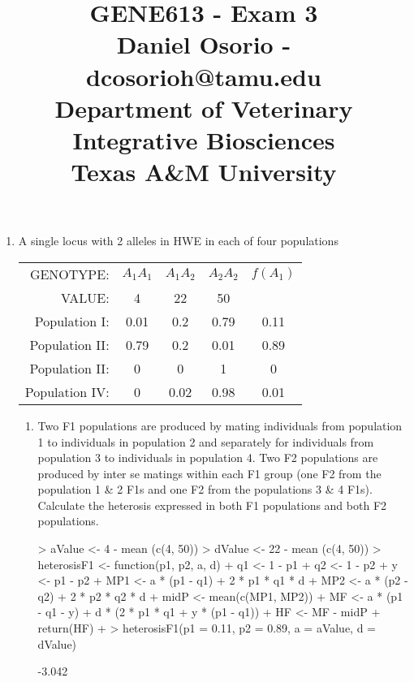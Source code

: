 \documentclass[12pt,a4paper]{paper}
\begin{document}
\title{GENE613 - Exam 3\\\small{Daniel Osorio - dcosorioh@tamu.edu\\Department of Veterinary Integrative Biosciences\\Texas A\&M University}}
\maketitle

\begin{enumerate}
\item A single locus with 2 alleles in HWE in each of four populations
\begin{center}
\begin{tabular}{|r|c|c|c|c|}
\hline
GENOTYPE:&$A_{1}A_{1}$&$A_{1}A_{2}$&$A_{2}A_{2}$&$f(A_{1})$\\
VALUE:&4&22&50&\\
\hline
\hline
Population I:&0.01&0.2&0.79&0.11\\
\hline
Population II:&0.79&0.2&0.01&0.89\\
\hline
Population II:&0&0&1&0\\
\hline
Population IV:&0&0.02&0.98&0.01\\
\hline
\end{tabular}
\end{center}
\begin{enumerate}
\item Two F1 populations are produced by mating individuals from population 1 to individuals in population 2 and separately for individuals from population 3 to individuals in population 4. Two F2 populations are produced by inter se matings within each F1 group (one F2 from the population 1 \& 2 F1s and one F2 from the populations 3 \& 4 F1s). Calculate the heterosis expressed in both F1 populations and both F2 populations.
\begin{Schunk}
\begin{Sinput}
> aValue <- 4 - mean (c(4, 50))
> dValue <- 22 - mean (c(4, 50))
> heterosisF1 <- function(p1, p2, a, d){
+   q1 <- 1 - p1
+   q2 <- 1 - p2
+   y <- p1 - p2
+   MP1 <- a * (p1 - q1) + 2 * p1 * q1 * d
+   MP2 <- a * (p2 - q2) + 2 * p2 * q2 * d
+   midP <- mean(c(MP1, MP2))
+   MF <- a * (p1 - q1 - y) + d * (2 * p1 * q1 + y * (p1 - q1))
+   HF <- MF - midP
+   return(HF)
+ }
> heterosisF1(p1 = 0.11, p2 = 0.89, a = aValue, d = dValue)
\end{Sinput}
\begin{Soutput}
[1] -3.042
\end{Soutput}

\end{Schunk}
\end{enumerate}
\end{enumerate}
\end{document}
